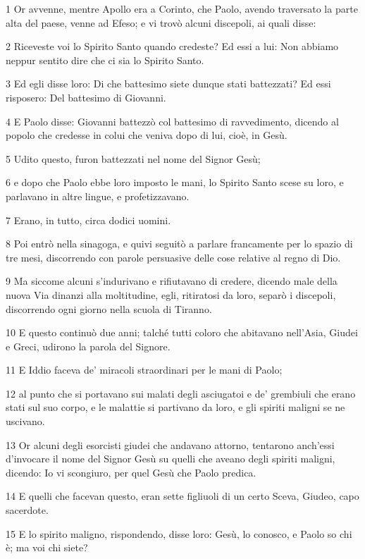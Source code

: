 \par 1 Or avvenne, mentre Apollo era a Corinto, che Paolo, avendo traversato la parte alta del paese, venne ad Efeso; e vi trovò alcuni discepoli, ai quali disse:
\par 2 Riceveste voi lo Spirito Santo quando credeste? Ed essi a lui: Non abbiamo neppur sentito dire che ci sia lo Spirito Santo.
\par 3 Ed egli disse loro: Di che battesimo siete dunque stati battezzati? Ed essi risposero: Del battesimo di Giovanni.
\par 4 E Paolo disse: Giovanni battezzò col battesimo di ravvedimento, dicendo al popolo che credesse in colui che veniva dopo di lui, cioè, in Gesù.
\par 5 Udito questo, furon battezzati nel nome del Signor Gesù;
\par 6 e dopo che Paolo ebbe loro imposto le mani, lo Spirito Santo scese su loro, e parlavano in altre lingue, e profetizzavano.
\par 7 Erano, in tutto, circa dodici uomini.
\par 8 Poi entrò nella sinagoga, e quivi seguitò a parlare francamente per lo spazio di tre mesi, discorrendo con parole persuasive delle cose relative al regno di Dio.
\par 9 Ma siccome alcuni s'indurivano e rifiutavano di credere, dicendo male della nuova Via dinanzi alla moltitudine, egli, ritiratosi da loro, separò i discepoli, discorrendo ogni giorno nella scuola di Tiranno.
\par 10 E questo continuò due anni; talché tutti coloro che abitavano nell'Asia, Giudei e Greci, udirono la parola del Signore.
\par 11 E Iddio faceva de' miracoli straordinari per le mani di Paolo;
\par 12 al punto che si portavano sui malati degli asciugatoi e de' grembiuli che erano stati sul suo corpo, e le malattie si partivano da loro, e gli spiriti maligni se ne uscivano.
\par 13 Or alcuni degli esorcisti giudei che andavano attorno, tentarono anch'essi d'invocare il nome del Signor Gesù su quelli che aveano degli spiriti maligni, dicendo: Io vi scongiuro, per quel Gesù che Paolo predica.
\par 14 E quelli che facevan questo, eran sette figliuoli di un certo Sceva, Giudeo, capo sacerdote.
\par 15 E lo spirito maligno, rispondendo, disse loro: Gesù, lo conosco, e Paolo so chi è; ma voi chi siete?
